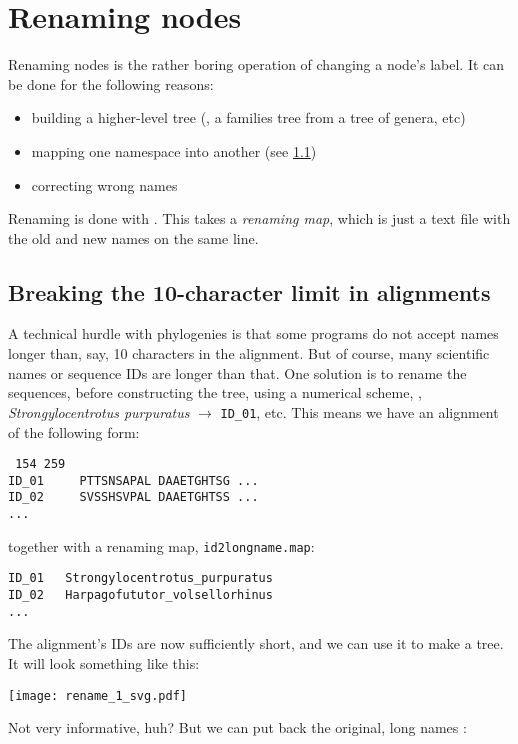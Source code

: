\section{Renaming nodes}
\label{sct_rename}

Renaming nodes is the rather boring operation of changing a node's label. It
can be done \eg{} for the following reasons:
\begin{itemize}
	\item building a higher-level tree (\ie, a families tree from a tree of genera, etc)
	\item mapping one namespace into another (see \ref{sct_10_char_limit})
	\item correcting wrong names
\end{itemize}

\noindent{}Renaming is done with \rename. This takes a \emph{renaming map},
which is just a text file with the old and new names on the same line.

\subsection{Breaking the 10-character limit in \phylip{} alignments}
\label{sct_10_char_limit}

A technical hurdle with phylogenies is that some programs do not accept names
longer than, say, 10 characters in the \phylip{} alignment. But of
course, many scientific names or sequence \textsc{ID}s are longer than that.
One solution is to rename the sequences, before constructing the tree, using a
numerical scheme, \eg{}, \textit{Strongylocentrotus purpuratus} $\rightarrow$
\texttt{ID\_01}, etc. This means we have an alignment of the following form:
\begin{verbatim}
 154 259
ID_01     PTTSNSAPAL DAAETGHTSG ...
ID_02     SVSSHSVPAL DAAETGHTSS ...
...
\end{verbatim}
together with a renaming map, \texttt{id2longname.map}:
\begin{verbatim}
ID_01	Strongylocentrotus_purpuratus
ID_02	Harpagofututor_volsellorhinus
...
\end{verbatim}
The alignment's \textsc{ID}s are now sufficiently short, and we can use it to
make a tree. It will look something like this:


\begin{center}
\texttt{[image: rename\_1\_svg.pdf]}
\end{center}

\noindent{}Not very informative, huh? But we can put back the original, long
names :

